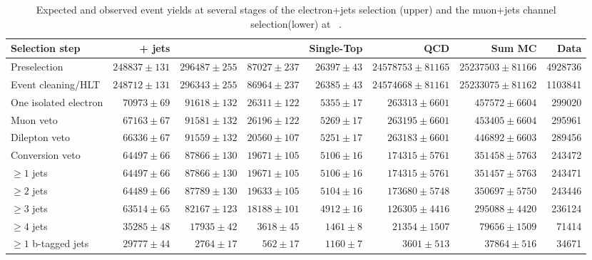 \begin{table}
  \centering
   \caption{Expected and observed event yields at several stages of the electron+jets selection (upper) and
   the muon+jets channel selection(lower) at ~\TeV.}
    \label{tab:cut_flow_7TeV}
    \resizebox{\columnwidth}{!} {
    \begin{tabular}{lrrrrrrr}
    \hline
    \hline
	Selection step & \ttbar + jets & \WpJets & \ZpJets & Single-Top & QCD & Sum MC & Data \\
	\hline
	Preselection  &  $248837 \pm 131$ &  $296487 \pm 255$ &  $87027 \pm 237$ &  $26397 \pm 43$ &  $24578753 \pm 81165$ &  $25237503 \pm 81166$ &  4928736 \\ 
	Event cleaning/HLT  &  $248712 \pm 131$ &  $296343 \pm 255$ &  $86964 \pm 237$ &  $26385 \pm 43$ &  $24574668 \pm 81161$ &  $25233075 \pm 81162$ &  1103841 \\ 
	One isolated electron  &  $70973 \pm 69$ &  $91618 \pm 132$ &  $26311 \pm 122$ &  $5355 \pm 17$ &  $263313 \pm 6601$ &  $457572 \pm 6604$ &  299020 \\ 
	Muon veto  &  $67163 \pm 67$ &  $91581 \pm 132$ &  $26196 \pm 122$ &  $5269 \pm 17$ &  $263195 \pm 6601$ &  $453405 \pm 6604$ &  295961 \\ 
	Dilepton veto  &  $66336 \pm 67$ &  $91559 \pm 132$ &  $20560 \pm 107$ &  $5251 \pm 17$ &  $263183 \pm 6601$ &  $446892 \pm 6603$ &  289456 \\ 
	Conversion veto  &  $64497 \pm 66$ &  $87866 \pm 130$ &  $19671 \pm 105$ &  $5106 \pm 16$ &  $174315 \pm 5761$ &  $351458 \pm 5763$ &  243472 \\ 
	$\geq 1$ jets  &  $64497 \pm 66$ &  $87866 \pm 130$ &  $19671 \pm 105$ &  $5106 \pm 16$ &  $174315 \pm 5761$ &  $351457 \pm 5763$ &  243471 \\ 
	$\geq 2$ jets  &  $64489 \pm 66$ &  $87789 \pm 130$ &  $19633 \pm 105$ &  $5104 \pm 16$ &  $173680 \pm 5748$ &  $350697 \pm 5750$ &  243446 \\ 
	$\geq 3$ jets  &  $63514 \pm 65$ &  $82167 \pm 123$ &  $18188 \pm 101$ &  $4912 \pm 16$ &  $126305 \pm 4416$ &  $295088 \pm 4420$ &  236124 \\ 
	$\geq 4$ jets  &  $35285 \pm 48$ &  $17935 \pm 42$ &  $3618 \pm 45$ &  $1461 \pm 8$ &  $21354 \pm 1507$ &  $79656 \pm 1509$ &  71414 \\ 
	$\geq 1$ b-tagged jets  &  $29777 \pm 44$ &  $2764 \pm 17$ &  $562 \pm 17$ &  $1160 \pm 7$ &  $3601 \pm 513$ &  $37864 \pm 516$ &  34671 \\ 

\end{tabular}}
\end{table}
